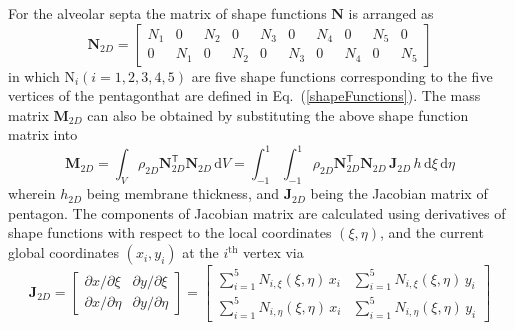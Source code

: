 For the alveolar septa the matrix of shape functions $\mathbf{N}$ is arranged as
\begin{equation}
\mathbf{N}_{2D} = 
\begin{bmatrix}
N_1 & 0 & N_2 & 0 & N_3 & 0 & N_4 & 0 & N_5 & 0\\ 0 & N_1 & 0 & N_2 & 0 & N_3 & 0 & N_4 & 0 & N_5
\end{bmatrix} 
\label{shape2D}
\end{equation}
in which $\mathrm{N}_i (i = 1, 2, 3,4,5)$ are five shape functions corresponding to the five vertices of the pentagonthat are defined in Eq.~(\ref{shapeFunctions}).
The mass matrix $\mathbf{M}_{2D}$ can also be obtained by substituting the above shape function matrix into 
\begin{equation}
\mathbf{M}_{2D} = \int_{V} \rho_{2D}  \mathbf{N}_{2D}^{\mathsf{T}} \mathbf{N}_{2D} \, \mathrm{d} V = \int_{-1}^{1} \int_{-1}^{1} \rho_{2D} \mathbf{N}_{2D}^{\mathsf{T}} \mathbf{N}_{2D} \,\mathbf{J}_{2D} \, h \, \mathrm{d} \xi \, \mathrm{d} \eta
\end{equation}
wherein $h_{2D}$ being membrane thickness, and $\mathbf{J}_{2D}$ being the Jacobian matrix of pentagon. The components of Jacobian matrix are calculated using derivatives of shape functions with respect to the local coordinates $(\xi, \eta)$, and the current global coordinates $(x_i, y_i)$ at the $i^{\mathrm{th}}$ vertex via
\begin{equation}
\mathbf{J}_{2D} = 
\begin{bmatrix}
\partial x / \partial\xi & \partial y / \partial\xi \\
\partial x / \partial\eta & \partial y / \partial\eta 
\end{bmatrix} = \begin{bmatrix}
\sum\nolimits_{i=1}^5 N_{i,\xi} (\xi,\eta) \, x_i & \sum\nolimits_{i=1}^5 N_{i,\xi} (\xi,\eta) \, y_i \\
\sum\nolimits_{i=1}^5 N_{i,\eta} (\xi,\eta) \, x_i & \sum\nolimits_{i=1}^5 N_{i,\eta} (\xi,\eta) \, y_i
\end{bmatrix}
\label{jacobian}
\end{equation}










